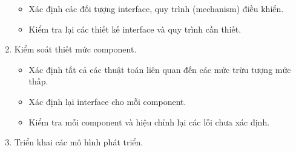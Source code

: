 \documentclass[./../SoftwareEngineering.tex]{subfiles}
\begin{document}
\begin{minipage}{\textwidth}
\begin{enumerate}
\begin{itemize}
				\item Xác định các đối tượng interface, quy trình (mechanism) điều khiển.
				
				\item Kiểm tra lại các thiết kế interface và quy trình cần thiết.
			\end{itemize}
			
			
			
			\item Kiểm soát thiết mức component.
			\begin{itemize}
				\item Xác định tất cả các thuật toán liên quan đến các mức trừu tượng mức thấp.
				
				\item Xác định lại interface cho mỗi component.
				
				\item Kiểm tra mỗi component và hiệu chỉnh lại các lỗi chưa xác định.
			\end{itemize}
			
			\item Triển khai các mô hình phát triển.
		\end{enumerate}	
	\end{minipage}
\end{document}

